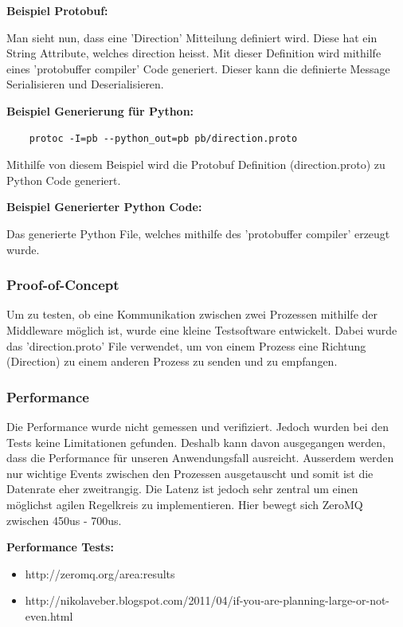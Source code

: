 \documentclass[../../main.tex]{subfiles}
\begin{document}
\textbf{Beispiel Protobuf:}

Man sieht nun, dass eine 'Direction' Mitteilung definiert wird. Diese hat ein String Attribute, welches direction heisst. Mit dieser Definition
wird mithilfe eines 'protobuffer compiler' Code generiert. Dieser kann die definierte Message Serialisieren und Deserialisieren.

\textbf{Beispiel Generierung für Python:}
\begin{lstlisting}
    protoc -I=pb --python_out=pb pb/direction.proto
\end{lstlisting}
Mithilfe von diesem Beispiel wird die Protobuf Definition (direction.proto) zu Python Code generiert.

\textbf{Beispiel Generierter Python Code:}

Das generierte Python File, welches mithilfe des 'protobuffer compiler' erzeugt wurde.

\subsubsection{Proof-of-Concept}
Um zu testen, ob eine Kommunikation zwischen zwei Prozessen mithilfe der Middleware möglich ist, wurde eine kleine Testsoftware entwickelt.
Dabei wurde das 'direction.proto' File verwendet, um von einem Prozess eine Richtung (Direction) zu einem anderen
Prozess zu senden und zu empfangen.

\subsubsection{Performance}
Die Performance wurde nicht gemessen und verifiziert. Jedoch wurden bei den Tests keine Limitationen gefunden. Deshalb kann davon ausgegangen werden,
dass die Performance für unseren Anwendungsfall ausreicht. Ausserdem werden nur wichtige Events zwischen den Prozessen ausgetauscht und somit ist die Datenrate
eher zweitrangig. Die Latenz ist jedoch sehr zentral um einen möglichst agilen Regelkreis zu implementieren. Hier bewegt sich ZeroMQ zwischen 450us - 700us.

\textbf{Performance Tests:}
\begin{itemize}
    \item http://zeromq.org/area:results
    \item http://nikolaveber.blogspot.com/2011/04/if-you-are-planning-large-or-not-even.html
\end{itemize}
\end{document}

